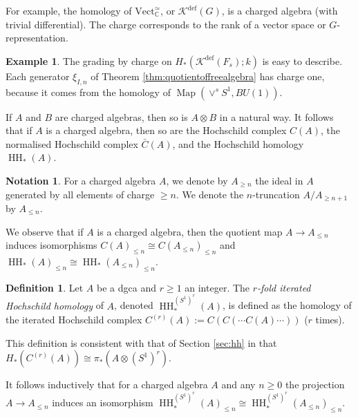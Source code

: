 \documentclass[oneside, a4paper, 12pt]{article}
\numberwithin{equation}{section}
\DeclareMathOperator{\HH}{HH}
\newcommand{\Kdef}{\mathcal{K}^{\mathrm{def}}}
\newcommand{\C}{\mathbb{C}}
\newcommand{\Vect}{\mathrm{Vect}}
\newcommand{\Map}{\operatorname{Map}}
\theoremstyle{plain}
\theoremstyle{definition}
\newtheorem{definition}[theorem]{Definition}
\newtheorem{example}[theorem]{Example}
\newtheorem{notation}[theorem]{Notation}
\theoremstyle{remark}
\begin{document}
For example, the homology of $\Vect_{\C}^\simeq$, or $\Kdef(G)$, is a charged algebra (with trivial differential). The charge corresponds to the rank of a vector space or $G$-representation.

\begin{example}
The grading by charge on $H_\ast(\Kdef(F_s);k)$ is easy to describe. Each generator $\xi_{I,n}$ of Theorem \ref{thm:quotientoffreealgebra} has charge one, because it comes from the homology of $\Map(\vee^s S^1,BU(1))$.
\end{example}

If $A$ and $B$ are charged algebras, then so is $A\otimes B$ in a natural way. It follows that if $A$ is a charged algebra, then so are the Hochschild complex $C(A)$, the normalised Hochschild complex $\bar{C}(A)$, and the Hochschild homology $\HH_\ast(A)$.

\begin{notation}
For a charged algebra $A$, we denote by $A_{\geq n}$ the ideal in $A$ generated by all elements of charge $\geq n$. We denote the $n$-truncation $A/A_{\geq n+1}$ by $A_{\leq n}$.
\end{notation}

We observe that if $A$ is a charged algebra, then the quotient map $A\to A_{\leq n}$ induces isomorphisms $C(A)_{\leq n}\cong C(A_{\leq n})_{\leq n}$ and $\HH_\ast(A)_{\leq n}\cong \HH_\ast(A_{\leq n})_{\leq n}$.

\begin{definition} \label{def:iterated}
Let $A$ be a dgca and $r\geq 1$ an integer. The \emph{$r$-fold iterated Hochschild homology} of $A$, denoted $\HH_\ast^{(S^1)^r}(A)$, is defined as the homology of the iterated Hochschild complex $C^{(r)}(A):=C(C(\cdots C(A)\cdots))$ ($r$ times).
\end{definition}

This definition is consistent with that of Section \ref{sec:hh} in that $H_\ast(C^{(r)}(A))\cong \pi_\ast(A\otimes (S^1)^r)$.

It follows inductively that for a charged algebra $A$ and any $n\geq 0$ the projection $A\to A_{\leq n}$ induces an isomorphism $\HH_\ast^{(S^1)^r}(A)_{\leq n}\cong \HH_\ast^{(S^1)^r}(A_{\leq n})_{\leq n}$.
\end{document}
